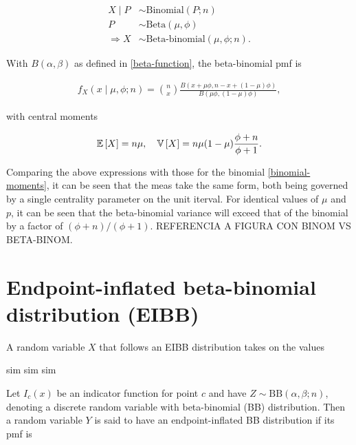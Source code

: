 \begin{equation}
\begin{split}
X \mid P &\sim \text{Binomial}(P; n)\\
P &\sim \text{Beta}(\mu, \phi)\\
\Rightarrow X &\sim \text{Beta-binomial}(\mu, \phi; n).
\end{split}
\end{equation}

With $B(\alpha,\beta)$ as defined in \ref{beta-function}, the beta-binomial pmf is

\begin{equation}
\begin{split}
f_X(x \mid \mu, \phi; n) = \binom{n}{x}\frac{B(x+\mu\phi, n - x + (1-\mu)\phi)}{B(\mu\phi, (1-\mu)\phi)},
\end{split}
\label{betabinomial-pmf}
\end{equation}

with central moments

\begin{equation}
\begin{split}
{\mathbb E}\left[ X \right] = n\mu, \quad {\mathbb V}\left[ X \right] = n\mu(1-\mu)\frac{\phi+n}{\phi+1}.
\end{split}
\end{equation}

Comparing the above expressions with those for the binomial \ref{binomial-moments}, it can be seen that the meas take the same form, both being governed by a single centrality parameter on the unit iterval. For identical values of $\mu$ and $p$, it can be seen that the beta-binomial variance will exceed that of the binomial by a factor of $(\phi+n)/(\phi+1)$. REFERENCIA A FIGURA CON BINOM VS BETA-BINOM.

\section{Endpoint-inflated beta-binomial distribution (EIBB)}
\label{sec:eibb-dist}

A random variable $X$ that follows an EIBB distribution takes on the values

sim sim sim

Let $I_c(x)$ be an indicator function for point $c$ and have $Z \sim \mathrm{BB}(\alpha, \beta; n)$, denoting a discrete random variable with beta-binomial (BB) distribution. Then a random variable $Y$ is said to have an endpoint-inflated BB distribution if its pmf is

